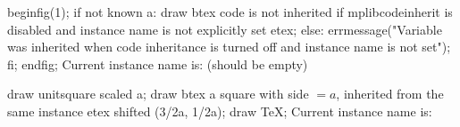 \mplibcode
beginfig(1);
if not known a:
  draw btex code is not inherited if mplibcodeinherit is disabled and instance name is not explicitly set etex;
else:
  errmessage("Variable was inherited when code inheritance is turned off and instance name is not set");
fi;
endfig;
\endmplibcode
Current instance name is: \currentmpinstancename (should be empty) \baselineskip

\mplibcode[instanceOne]
draw unitsquare scaled a;
draw btex a square with side $=a$, inherited from the same instance etex shifted (3/2a, 1/2a);
  draw TeX;
\endmplibcode
Current instance name is: \currentmpinstancename {}\baselineskip

\bye

